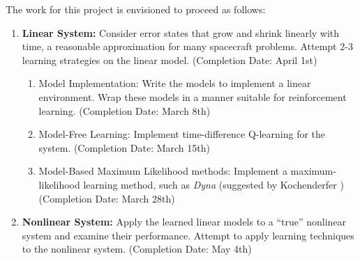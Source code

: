 \documentclass[]{article}
\begin{document}
The work for this project is envisioned to proceed as follows:
\begin{enumerate}
	\item \textbf{Linear System:} Consider error states that grow and shrink linearly with time, a reasonable approximation for many spacecraft problems. Attempt 2-3 learning strategies on the linear model. (Completion Date: April 1st)
	\begin{enumerate}
		\item Model Implementation: Write the models to implement a linear environment. Wrap these models in a manner suitable for reinforcement learning. (Completion Date: March 8th)
		\item Model-Free Learning: Implement time-difference Q-learning for the system. (Completion Date: March 15th)
		\item Model-Based Maximum Likelihood methods: Implement a maximum-likelihood learning method, such as \textit{Dyna} (suggested by Kochenderfer \cite{bibid})(Completion Date: March 28th)
	\end{enumerate}
	\item \textbf{Nonlinear System:} Apply the learned linear models to a ``true'' nonlinear system and examine their performance. Attempt to apply learning techniques to the nonlinear system. (Completion Date: May 4th)
\end{enumerate}
	
\end{document}
